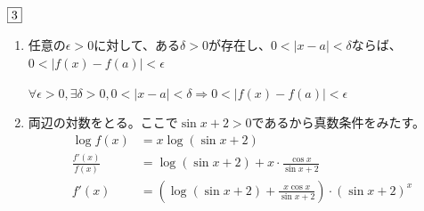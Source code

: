 \documentclass[dvipdfmx]{jsreport}
\begin{document}
\begin{souanswer} %
	$\fbox{3}$
\begin{enumerate}
	\item 任意の$\epsilon> 0$に対して、ある$\delta> 0$が存在し、$	0< |x- a|< \delta$ならば、$0< |f(x)- f(a)|< \epsilon$
\begin{tcolorbox}[title= 論理記号ver.]
	$\forall \epsilon>0, \exists \delta> 0, 0< |x- a|< \delta \Longrightarrow 0< |f(x)- f(a)|< \epsilon$
\end{tcolorbox}

	\item 両辺の対数をとる。ここで$\sin{x}+ 2> 0$であるから真数条件をみたす。
\begin{align*}
	\log{f(x)}&= x\log{(\sin{x}+ 2)}\\
	\frac{f'(x)}{f(x)}&= \log{(\sin{x}+ 2)}+ x\cdot \frac{\cos{x}}{\sin{x}+ 2}\\
	f'(x)&= \left(\log{(\sin{x}+ 2)}+ \frac{x\cos{x}}{\sin{x}+ 2}\right)\cdot(\sin{x}+ 2)^x
\end{align*}


\end{enumerate}
\end{souanswer}
\end{document}
